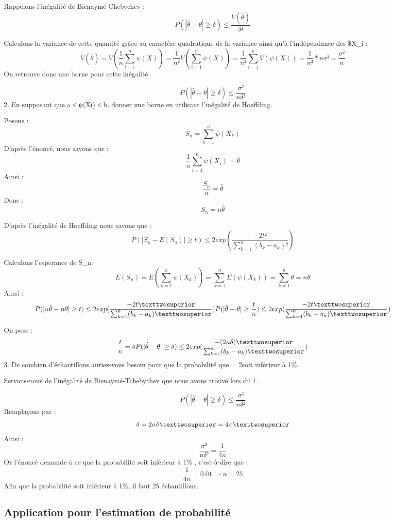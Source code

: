 \documentclass[
]{article}
\begin{document}
Rappelons l'inégalité de Bienaymé Chebychev : \[
P(| \hat{\theta}-\theta| \ge \delta) \le \frac{V(\hat{\theta})}{\delta²}
\]

Calculons la variance de cette quantité grâce au caractère quadratique
de la variance ainsi qu'à l'indépendance des \$X\_i : \[
V(\hat{\theta}) = V(\frac{1}{n} \sum_{i=1}^{n} \psi(X)) = \frac{1}{n²}V(\sum_{i=1}^n \psi(X)) = \frac{1}{n²} \sum_{i=1}^n V(\psi(X)) = \frac{1}{n²} *n\sigma² = \frac{\sigma²}{n}
\] On retrouve donc une borne pour cette inégalité.

\[
P(|\hat{\theta} - \theta| \ge \delta) \le \frac{\sigma²}{n\delta²}
\] 2. En supposant que a ≤ ψ(Xi) ≤ b, donner une borne en utilisant
l'inégalité de Hoeffding.

Posons : \[
S_{n} = \sum_{k=1}^n \psi(X_k)
\] D'après l'énoncé, nous savons que : \[
\frac{1}{n} \sum_{i=1}^n \psi(X_i) = \hat{\theta}
\] Ainsi : \[
\frac{S_n}{n} = \hat{\theta} 
\] Donc : \[
S_n=n\hat{\theta}
\]

D'après l'inégalité de Hoeffding nous savons que : \[
P(|S_n - E(S_n)| \geq t) \leq 2exp(\frac{-2t²}{\sum_{k=1}^n (b_k-a_k)²})
\]

Calculons l'esperance de S\_n: \[
E(S_n) = E(\sum_{k=1}^n \psi(X_k)) = \sum_{k=1}^n E(\psi(X_k)) = \sum_{k=1}^n \theta = n\theta
\] Ainsi : \[
P(|n\hat{\theta} - n\theta| \geq t) \leq 2exp(\frac{-2t²}{\sum_{k=1}^n (b_k-a_k)²})
\\
P(|\hat{\theta} - \theta| \geq \frac{t}{n}) \leq 2exp(\frac{-2t²}{\sum_{k=1}^n (b_k-a_k)²})
\]

On pose : \[
\frac{t}{n} = \delta
\\
P(|\hat{\theta} - \theta| \geq \delta) \leq 2exp(\frac{-(2n\delta)²}{\sum_{k=1}^n (b_k-a_k)²})
\] 3. De combien d'échantillons auriez-vous besoin pour que la
probabilité que \delta = 2\phi soit inférieur à 1\%.

Servons-nous de l'inégalité de Bienaymé-Tchebychev que nous avons trouvé
lors du 1.

\[
P(|\hat{\theta} - \theta| \ge \delta) \le \frac{\sigma²}{n\delta²}
\] Remplaçons par : \[
\delta = 2\sigma
\\
\delta²=4\sigma²
\] Ainsi : \[
\frac{\sigma²}{n\delta²} = \frac{1}{4n}
\] Or l'énoncé demande à ce que la probabilité soit inférieur à 1\% ,
c'est-à-dire que : \[
\frac{1}{4n} = 0.01  \Longrightarrow n=25
\] Afin que la probabilité soit inférieur à 1\%, il faut 25
échantillons.

\hypertarget{application-pour-lestimation-de-probabilituxe9}{%
\subsection{Application pour l'estimation de
probabilité}\label{application-pour-lestimation-de-probabilituxe9}}
\end{document}
